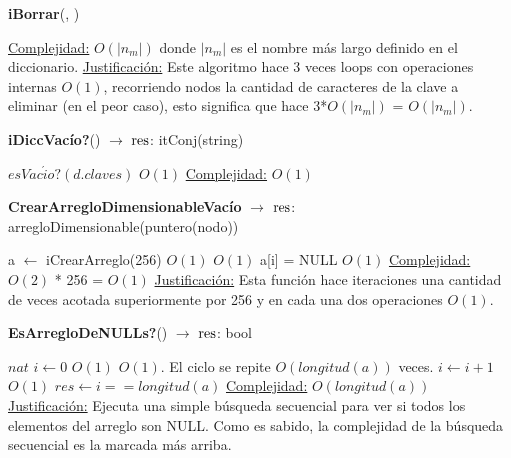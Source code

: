 \begin{Algoritmos}
\begin{algorithm}[H]{\textbf{iBorrar}(, )}
\begin{algorithmic}
    \Statex \underline{Complejidad:} $O(|n_{m}|)$ donde $|n_{m}|$ es el nombre más largo definido en el diccionario.
    \Statex \underline{Justificación:} Este algoritmo hace 3 veces loops con operaciones internas $O(1)$, recorriendo nodos la cantidad de caracteres de la clave a eliminar (en el peor caso), esto significa que hace 3*$O(|n_{m}|)$ = $O(|n_{m}|)$.
	\end{algorithmic}
\end{algorithm}  

\begin{algorithm}[H]{\textbf{iDiccVac\'io?}() $\to$ $\res$: itConj(string)}
	\begin{algorithmic}
		\State $esVac\acute{i}o?(d.claves)$	\Comment $O(1)$
        \Statex \underline{Complejidad:} $O(1)$
	\end{algorithmic}
\end{algorithm}

\pagebreak


\begin{algorithm}[H]{\textbf{CrearArregloDimensionableVacío} $\to$ $\res$: arregloDimensionable(puntero(nodo))}
	\begin{algorithmic}
	\State a $\gets$ iCrearArreglo(256) \Comment $O(1)$
         \Comment $O(1)$
       	\State a[i] = NULL \Comment $O(1)$
        \EndFor
\Statex \underline{Complejidad:} $O(2)$ * 256 = $O(1)$
        \Statex \underline{Justificación:} Esta función hace iteraciones una cantidad de veces acotada superiormente por 256 y en cada una dos operaciones $O(1)$.
	\end{algorithmic}
\end{algorithm}

\begin{algorithm}[H]{\textbf{EsArregloDeNULLs?}() $\to$ $\res$: bool}
	\begin{algorithmic}
    	\State $nat$ $i \gets 0$	\Comment $O(1)$
        	\Comment $O(1)$. El ciclo se repite $O(longitud(a))$ veces.
        	\State $i \gets i+1$ \Comment $O(1)$
        \EndWhile
        \State $res \gets i == longitud(a)$
        \Statex \underline{Complejidad:} $O(longitud(a))$
        \Statex \underline{Justificaci\'on:} Ejecuta una simple b\'usqueda secuencial para ver si todos los elementos del arreglo son NULL. Como es sabido, la complejidad de la b\'usqueda secuencial es la marcada m\'as arriba.
	\end{algorithmic}
\end{algorithm}


\end{Algoritmos}
